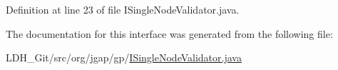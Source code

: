 Definition at line 23 of file I\-Single\-Node\-Validator.\-java.



The documentation for this interface was generated from the following file\-:\begin{DoxyCompactItemize}
\item 
L\-D\-H\-\_\-\-Git/src/org/jgap/gp/\hyperlink{_i_single_node_validator_8java}{I\-Single\-Node\-Validator.\-java}\end{DoxyCompactItemize}

